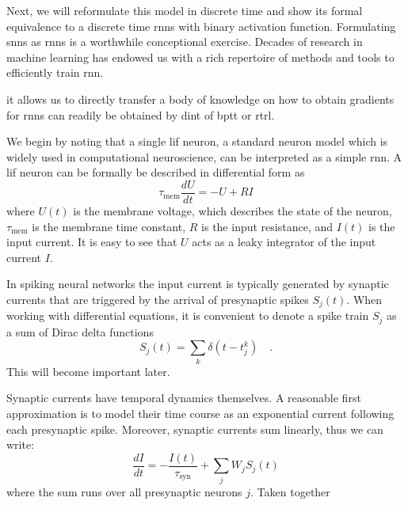 \documentclass[journal,onecolumn,11pt]{IEEEtran}
\begin{document}
Next, we will reformulate this model in discrete time and show its formal equivalence to a discrete time \glspl{rnn} with binary activation function. 
Formulating \glspl{snn} as \glspl{rnn} is a worthwhile conceptional exercise. 
Decades of research in machine learning has endowed us with a rich repertoire of methods and tools to efficiently train \gls{rnn}.


it allows us to directly transfer a body of knowledge on how to obtain gradients for \glspl{rnn} can readily be obtained by dint of \gls{bptt} or \gls{rtrl}. %


We begin by noting that a single \gls{lif} neuron, a standard neuron model which is widely used in computational neuroscience, can be interpreted as a simple \gls{rnn}. 
A \gls{lif} neuron can be formally be described in differential form as
\begin{equation}\label{eq:lif}
    \tau_\mathrm{mem} \frac{dU}{dt} = -U + RI
\end{equation}
where $U(t)$ is the membrane voltage, which describes the state of the neuron, $\tau_\mathrm{mem}$ is the membrane time constant, $R$ is the input resistance, and $I(t)$ is the input current.
It is easy to see that $U$ acts as a leaky integrator of the input current $I$.

In spiking neural networks the input current is typically generated by synaptic currents that are triggered by the arrival of presynaptic spikes $S_j(t)$.
When working with differential equations, it is convenient to denote a spike train $S_j$ as a sum of Dirac delta functions
$$S_j(t)=\sum_k \delta(t-t_j^k) \quad .$$
This will become important later.

Synaptic currents have temporal dynamics themselves. A reasonable first approximation is to model their time course as an exponential current following each presynaptic spike. Moreover, synaptic currents sum linearly, thus we can write:
\begin{equation}\label{eq:syn}
    \frac{dI}{dt}= -\frac{I(t)}{\tau_\mathrm{syn}} + \sum_j W_j S_j(t)
\end{equation}
where the sum runs over all presynaptic neurons $j$.
Taken together 

\end{document}
